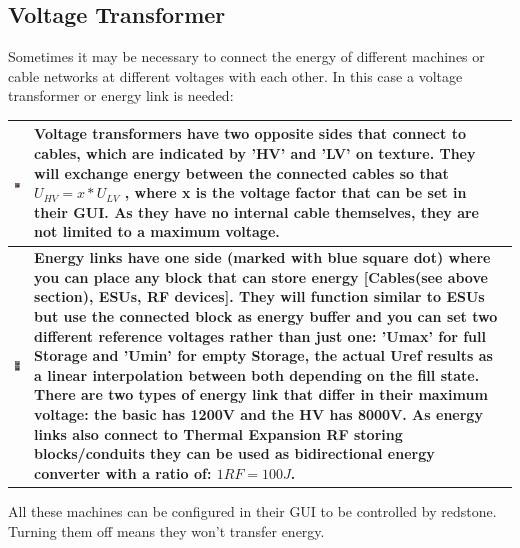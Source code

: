 \documentclass[11pt]{article} %
\makeatletter
\newcommand{\imgtex}{\begin{tabularx}{\textwidth}{@{}c@{ }X@{}}}
\makeatother
\begin{document}
\subsection{Voltage Transformer}
Sometimes it may be necessary to connect the energy of different machines or cable networks at different voltages with each other. In this case a voltage transformer or energy link is needed: \\
\imgtex \hline
\includegraphics[align = t]{blockTransformer} & \bf Voltage transformers \rm have two opposite sides that connect to cables, which are indicated by 'HV' and 'LV' on texture. They will exchange energy between the connected cables so that ${U_{HV} = x * U_{LV}}$ , where x is the voltage factor that can be set in their GUI. As they have no internal cable themselves, they are not limited to a maximum voltage.\\ \hline
\includegraphics[align = t]{blockELink} & \bf Energy links \rm have one side (marked with blue square dot) where you can place any block that can store energy [Cables(see above section), ESUs, RF devices]. They will function similar to ESUs but use the connected block as energy buffer and you can set two different reference voltages rather than just one: 'Umax' for full Storage and 'Umin' for empty Storage, the actual Uref results as a linear interpolation between both depending on the fill state. There are two types of energy link that differ in their maximum voltage: the basic has 1200V and the HV has 8000V.  As energy links also connect to Thermal Expansion RF storing blocks/conduits they can be used as bidirectional energy converter with a ratio of: ${1RF = 100J}$. \\ \hline
\end{tabularx}
All these machines can be configured in their GUI to be controlled by redstone. Turning them off means they won't transfer energy.
\end{document}
